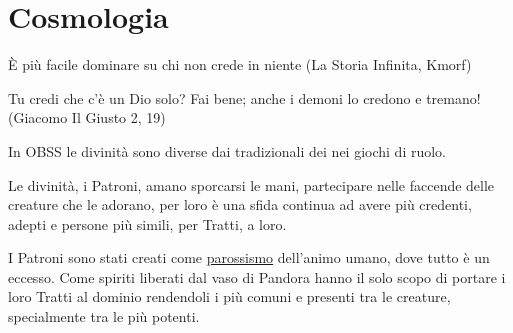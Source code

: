 \section{Cosmologia}\hypertarget{cosmologia}{}\label{cosmologia}

\begin{enfasi}{
È più facile dominare su chi non crede in niente (La Storia Infinita, Kmorf)

\medskip

Tu credi che c'è un Dio solo? Fai bene; anche i demoni lo credono e tremano! (Giacomo Il Giusto 2, 19)}\end{enfasi}

\begin{narratore}[I Patroni]

In OBSS le divinità sono diverse dai tradizionali dei nei giochi di ruolo.

Le divinità, i Patroni, amano sporcarsi le mani, partecipare nelle faccende delle creature che le adorano, per loro è una sfida continua ad avere più credenti, adepti e persone più simili, per Tratti, a loro.

I Patroni sono stati creati come \href{https://www.treccani.it/vocabolario/parossismo/}{parossismo} dell'animo umano, dove tutto è un eccesso. Come spiriti liberati dal vaso di Pandora hanno il solo scopo di portare i loro Tratti al dominio rendendoli i più comuni e presenti tra le creature, specialmente tra le più potenti.
\end{narratore}

\medskip

